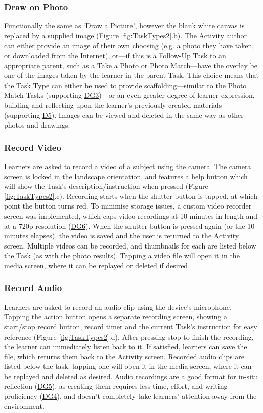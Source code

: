 \subsubsection*{Draw on Photo}
Functionally the same as `Draw a Picture', however the blank white canvas is replaced by a supplied image (Figure \ref{fig:TaskTypes2}.b). The Activity author can either provide an image of their own choosing (e.g. a photo they have taken, or downloaded from the Internet), or---if this is a Follow-Up Task to an appropriate parent, such as a Take a Photo or Photo Match---have the overlay be one of the images taken by the learner in the parent Task. This choice means that the Task Type can either be used to provide scaffolding---similar to the Photo Match Tasks (supporting \hyperref[DG3]{DG3})---or an even greater degree of learner expression, building and reflecting upon the learner's previously created materials (supporting \hyperref[DG5]{D5}). Images can be viewed and deleted in the same way as other photos and drawings. 

\subsubsection*{Record Video}
Learners are asked to record a video of a subject using the camera. The camera screen is locked in the landscape orientation, and features a help button which will show the Task's description/instruction when pressed (Figure \ref{fig:TaskTypes2}.c). Recording starts when the shutter button is tapped, at which point the button turns red. To minimise storage issues, a custom video recorder screen was implemented, which caps video recordings at 10 minutes in length and at a 720p resolution (\hyperref[DG6]{DG6}). When the shutter button is pressed again (or the 10 minutes elapses), the video is saved and the user is returned to the Activity screen. Multiple videos can be recorded, and thumbnails for each are listed below the Task (as with the photo results). Tapping a video file will open it in the media screen, where it can be replayed or deleted if desired.

\subsubsection*{Record Audio}
Learners are asked to record an audio clip using the device's microphone. Tapping the action button opens a separate recording screen, showing a start/stop record button, record timer and the current Task's instruction for easy reference (Figure \ref{fig:TaskTypes2}.d). After pressing stop to finish the recording, the learner can immediately listen back to it. If satisfied, learners can save the file, which returns them back to the Activity screen. Recorded audio clips are listed below the task: tapping one will open it in the media screen, where it can be replayed and deleted as desired. Audio recordings are a good format for in-situ reflection (\hyperref[DG5]{DG5}), as creating them requires less time, effort, and writing proficiency (\hyperref[DG4]{DG4}), and doesn't completely take learners' attention away from the environment.

